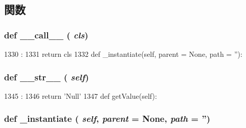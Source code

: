 \subsection{関数}
\hypertarget{classm5_1_1params_1_1NullSimObject_ae844e0019d38360a86bac1474132db3c}{
\subsubsection[{\_\-\_\-call\_\-\_\-}]{\setlength{\rightskip}{0pt plus 5cm}def \_\-\_\-call\_\-\_\- ( {\em cls})}}
\label{classm5_1_1params_1_1NullSimObject_ae844e0019d38360a86bac1474132db3c}



\begin{DoxyCode}
1330                      :
1331         return cls
1332 
    def _instantiate(self, parent = None, path = ''):
\end{DoxyCode}
\hypertarget{classm5_1_1params_1_1NullSimObject_aa7a4b9bc0941308e362738503137460e}{
\subsubsection[{\_\-\_\-str\_\-\_\-}]{\setlength{\rightskip}{0pt plus 5cm}def \_\-\_\-str\_\-\_\- ( {\em self})}}
\label{classm5_1_1params_1_1NullSimObject_aa7a4b9bc0941308e362738503137460e}



\begin{DoxyCode}
1345                      :
1346         return 'Null'
1347 
    def getValue(self):
\end{DoxyCode}
\hypertarget{classm5_1_1params_1_1NullSimObject_a84644d8fb6ace7953f0e78dec1ebce59}{
\subsubsection[{\_\-instantiate}]{\setlength{\rightskip}{0pt plus 5cm}def \_\-instantiate ( {\em self}, \/   {\em parent} = {\ttfamily None}, \/   {\em path} = {\ttfamily ''})}}
\label{classm5_1_1params_1_1NullSimObject_a84644d8fb6ace7953f0e78dec1ebce59}



